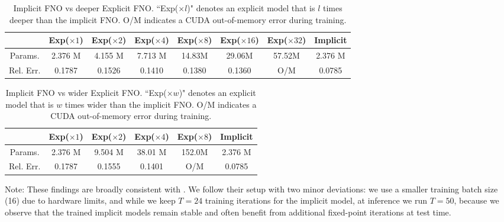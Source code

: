 \documentclass{amsart} %
\theoremstyle{definition}
\theoremstyle{remark}
\begin{document}
\begin{table}[t]
\centering
\caption{Implicit FNO vs deeper Explicit FNO. ``Exp($\times l$)" denotes an explicit model that is $l$ times deeper than the implicit FNO. O/M indicates a CUDA out-of-memory error during training.}
\label{tab:fno-deeper}
\begin{tabular}{c|c|c|c|c|c|c|c}
\hline
               & Exp($\times 1$)    & Exp($\times 2$)    & Exp($\times 4$) & Exp($\times 8$)    & Exp($\times 16$)    & Exp($\times 32$)  & Implicit    \\ \hline\hline
Params.  & 2.376 M           & 4.155 M           &  7.713 M   & 14.83M           & 29.06M           &     57.52M        & 2.376 M           \\ \hline
Rel. Err.     
& 0.1787
& 0.1526  & 0.1410 & 0.1380  & 0.1360  & O/M  & 0.0785  \\ \hline
\end{tabular}
\end{table}

\begin{table}[t]
\centering
\caption{Implicit FNO vs wider Explicit FNO. ``Exp($\times w$)" denotes an explicit model that is $w$ times wider than the implicit FNO. O/M indicates a CUDA out-of-memory error during training.}
\label{tab:fno-wider}
\begin{tabular}{c|c|c|c|c|c}
\hline
               & Exp($\times 1$)    & Exp($\times 2$)    & Exp($\times 4$) & Exp($\times 8$)      & Implicit    \\ \hline\hline
Params.  & 2.376 M           & 9.504 M           &  38.01 M   & 152.0M                    & 2.376 M           \\ \hline
Rel. Err.     
& 0.1787  & 0.1555  & 0.1401  & O/M  & 0.0785  \\ \hline
\end{tabular}
\end{table}



Note: These findings are broadly consistent with \cite{marwah2023deep}. We follow their setup with two minor deviations: we use a smaller training batch size (16) due to hardware limits, and while we keep $T=24$ training iterations for the implicit model, at inference we run $T=50$, because we observe that the trained implicit models remain stable and often benefit from additional fixed-point iterations at test time.
\end{document}
